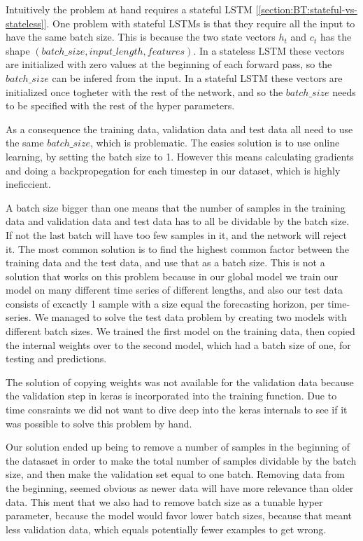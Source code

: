 Intuitively the problem at hand requires a stateful LSTM [\cref{section:BT:stateful-vs-stateless}].
One problem with stateful LSTMs is that they require all the input to have the same
batch size.
This is because the two state vectors $h_t$ and $c_t$ has the shape
$(batch\_size, input\_length, features)$. In a stateless LSTM these
vectors are initialized with zero values at the beginning of each forward pass,
so the $batch\_size$ can be infered from the input.
In a stateful LSTM these vectors are initialized once togheter with the rest
of the network, and so the $batch\_size$ needs to be specified with
the rest of the hyper parameters.

As a consequence the training data, validation data and test data all
need to use the same $batch\_size$, which is problematic.
The easies solution is to use online learning, by setting the batch size to 1.
However this means calculating gradients and doing a backpropegation for each
timestep in our dataset, which is highly ineficcient.

A batch size bigger than one means that the number of samples in
the training data and validation data and test data has to all be
dividable by the batch size. If not the last batch will have too few samples in it,
and the network will reject it.
The most common solution is to find the highest common factor
between the training data and the test data, and use that as a batch size.
This is not a solution that works on this problem because in our global model
we train our model on many different time series of different lengths,
and
also our test data consists of excactly 1 sample with a size equal the
forecasting horizon, per time-series.
We managed to solve the test data problem by creating two models with
different batch sizes. We trained the first model on the training data,
then copied the internal weights over to the second model, which had a
batch size of one, for testing and
predictions.

The solution of copying weights was not available for the validation data
because the validation step in keras is incorporated into the training function.
Due to time consraints we did not want to dive deep into the keras internals
to see if it was possible to solve this problem by hand.

Our solution ended up being to remove a number of samples in the beginning of
the datasaet in order to make the total number of samples dividable by the batch size,
and then make the validation set equal to one batch. Removing data from the beginning,
seemed obvious as newer data will have more relevance than older data.
This ment that we also had to remove batch size as a tunable hyper parameter,
because the model would favor lower batch sizes, because that meant less validation data,
which equals potentially fewer examples to get wrong.

